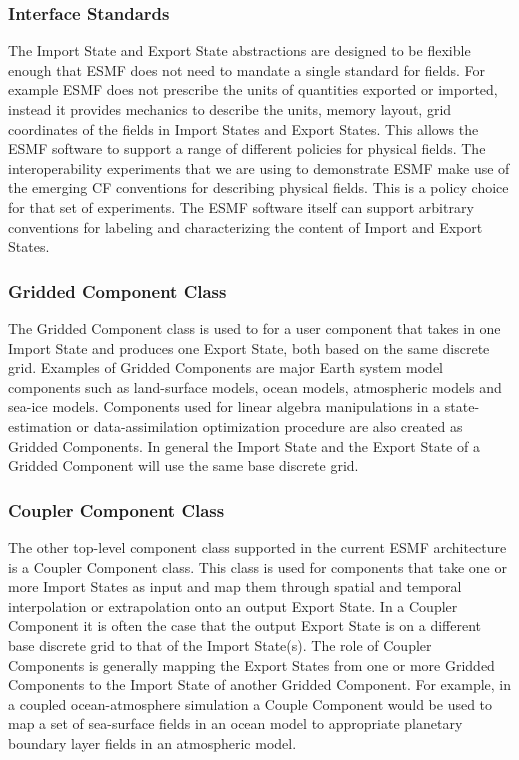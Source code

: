 \subsubsection{Interface Standards}
The Import State and Export State abstractions are designed to be flexible enough
that ESMF does not need to mandate a single standard for fields. For example ESMF does not prescribe the units
of quantities exported or imported, instead it provides mechanics to describe the units, memory layout, grid coordinates 
of the fields in Import States and Export States.  This allows the ESMF software to support a range of different policies for
physical fields. The interoperability experiments that we are using to demonstrate ESMF make use of the emerging
CF conventions \cite{ref:CF} for describing physical fields. This is a policy choice for that set of experiments. The ESMF 
software itself can support arbitrary conventions for labeling and characterizing the content of Import and 
Export States.

\subsubsection{Gridded Component Class}
The Gridded Component class is used to for a user component that takes in one Import State and produces one
Export State, both based on the same discrete grid. Examples of Gridded Components are major Earth system 
model components such as land-surface models, ocean models, atmospheric models and sea-ice models. Components 
used for linear algebra manipulations in a state-estimation or data-assimilation optimization procedure are also 
created as Gridded Components. In general the Import State and the Export State of a Gridded Component will 
use the same base discrete grid.

\subsubsection{Coupler Component Class}
The other top-level component class supported in the current ESMF architecture is a Coupler Component class.
This class is used for components that take one or more Import States as input and map them through
spatial and temporal interpolation or extrapolation onto an output Export State. In a Coupler Component
it is often the case that the output Export State is on a different base discrete grid to that of
the Import State(s). The role of Coupler Components is generally mapping the Export States from one or
more Gridded Components to the Import State of another Gridded Component. For example, in a coupled
ocean-atmosphere simulation a Couple Component would be used to map a set of sea-surface fields 
in an ocean model to appropriate planetary boundary layer fields in an atmospheric model.
